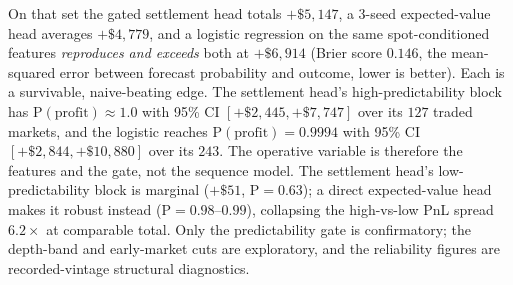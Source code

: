 \documentclass{article}
\begin{document}
On that set the gated settlement head totals $+\$5{,}147$, a 3-seed expected-value
head averages $+\$4{,}779$, and a logistic regression on the same spot-conditioned
features \emph{reproduces and exceeds} both at $+\$6{,}914$ (Brier score $0.146$,
the mean-squared error between forecast probability and outcome, lower is better).
Each is a survivable, naive-beating edge. The settlement head's high-predictability
block has $\mathrm{P(profit)}\approx1.0$ with 95\% CI $[+\$2{,}445,+\$7{,}747]$ over
its $127$ traded markets, and the logistic reaches $\mathrm{P(profit)}=0.9994$ with
95\% CI $[+\$2{,}844,+\$10{,}880]$ over its $243$. The operative variable is
therefore the features and the gate, not the sequence model. The settlement head's
low-predictability block is marginal ($+\$51$, $\mathrm{P}=0.63$); a direct
expected-value head makes it robust instead ($\mathrm{P}=0.98$--$0.99$), collapsing
the high-vs-low PnL spread $6.2\times$ at comparable total. Only the predictability
gate is confirmatory; the depth-band and early-market cuts are exploratory, and the
reliability figures are recorded-vintage structural diagnostics.
\end{document}
